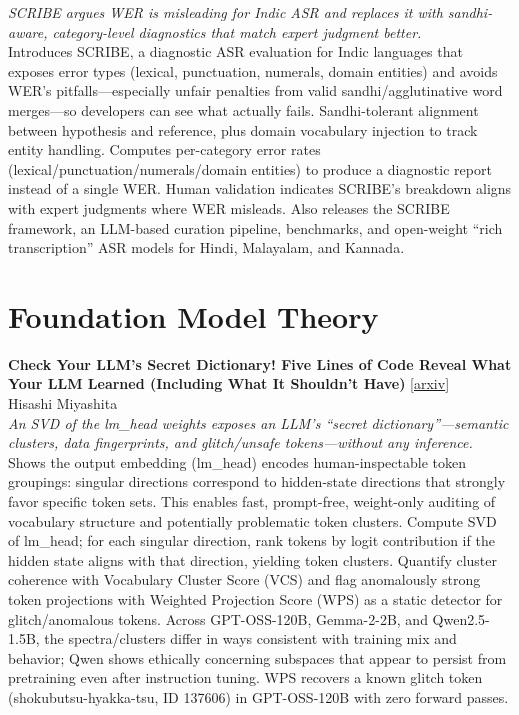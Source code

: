 \documentclass[12pt,letterpaper]{article}
\begin{document}
{\small\textit{SCRIBE argues WER is misleading for Indic ASR and replaces it with sandhi-aware, category-level diagnostics that match expert judgment better.}}\\[1pt]
{\footnotesize Introduces SCRIBE, a diagnostic ASR evaluation for Indic languages that exposes error types (lexical, punctuation, numerals, domain entities) and avoids WER's pitfalls---especially unfair penalties from valid sandhi/agglutinative word merges---so developers can see what actually fails. Sandhi-tolerant alignment between hypothesis and reference, plus domain vocabulary injection to track entity handling. Computes per-category error rates (lexical/punctuation/numerals/domain entities) to produce a diagnostic report instead of a single WER. Human validation indicates SCRIBE's breakdown aligns with expert judgments where WER misleads. Also releases the SCRIBE framework, an LLM-based curation pipeline, benchmarks, and open-weight ``rich transcription'' ASR models for Hindi, Malayalam, and Kannada.}

\medskip


\section*{Foundation Model Theory}

{\small\textbf{Check Your LLM's Secret Dictionary! Five Lines of Code Reveal What Your LLM Learned (Including What It Shouldn't Have)}} {\scriptsize[\href{https://arxiv.org/abs/2605.22005}{arxiv}]}\\
{\scriptsize Hisashi Miyashita}\\

{\small\textit{An SVD of the lm\_head weights exposes an LLM's ``secret dictionary''---semantic clusters, data fingerprints, and glitch/unsafe tokens---without any inference.}}\\[1pt]
{\footnotesize Shows the output embedding (lm\_head) encodes human-inspectable token groupings: singular directions correspond to hidden-state directions that strongly favor specific token sets. This enables fast, prompt-free, weight-only auditing of vocabulary structure and potentially problematic token clusters. Compute SVD of lm\_head; for each singular direction, rank tokens by logit contribution if the hidden state aligns with that direction, yielding token clusters. Quantify cluster coherence with Vocabulary Cluster Score (VCS) and flag anomalously strong token projections with Weighted Projection Score (WPS) as a static detector for glitch/anomalous tokens. Across GPT-OSS-120B, Gemma-2-2B, and Qwen2.5-1.5B, the spectra/clusters differ in ways consistent with training mix and behavior; Qwen shows ethically concerning subspaces that appear to persist from pretraining even after instruction tuning. WPS recovers a known glitch token (shokubutsu-hyakka-tsu, ID 137606) in GPT-OSS-120B with zero forward passes.}
\end{document}

